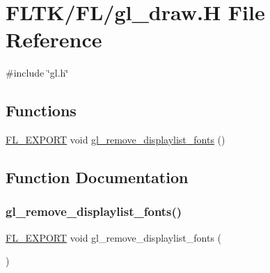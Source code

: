 \hypertarget{gl__draw_8_h}{}\section{F\+L\+T\+K/\+F\+L/gl\+\_\+draw.H File Reference}
\label{gl__draw_8_h}
{\ttfamily \#include \char`\"{}gl.\+h\char`\"{}}\newline
\subsection*{Functions}
\begin{DoxyCompactItemize}
\item 
\hyperlink{_fl___export_8_h_aa9ba29a18aee9d738370a06eeb4470fc}{F\+L\+\_\+\+E\+X\+P\+O\+RT} void \hyperlink{gl__draw_8_h_ad85e64ab3e2f033c0f04702235fee63a}{gl\+\_\+remove\+\_\+displaylist\+\_\+fonts} ()
\end{DoxyCompactItemize}


\subsection{Function Documentation}
\mbox{\label{gl__draw_8_h_ad85e64ab3e2f033c0f04702235fee63a}} 
\subsubsection{\texorpdfstring{gl\+\_\+remove\+\_\+displaylist\+\_\+fonts()}{gl\_remove\_displaylist\_fonts()}}
{\footnotesize\ttfamily \hyperlink{_fl___export_8_h_aa9ba29a18aee9d738370a06eeb4470fc}{F\+L\+\_\+\+E\+X\+P\+O\+RT} void gl\+\_\+remove\+\_\+displaylist\+\_\+fonts (\begin{DoxyParamCaption}{ }\end{DoxyParamCaption})}

